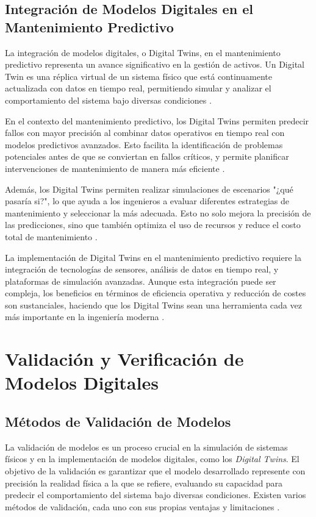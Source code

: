 \subsection{Integración de Modelos Digitales en el Mantenimiento Predictivo}

La integración de modelos digitales, o Digital Twins, en el mantenimiento predictivo representa un avance significativo en la gestión de activos. Un Digital Twin es una réplica virtual de un sistema físico que está continuamente actualizada con datos en tiempo real, permitiendo simular y analizar el comportamiento del sistema bajo diversas condiciones \cite{gabor2021digital}.

En el contexto del mantenimiento predictivo, los Digital Twins permiten predecir fallos con mayor precisión al combinar datos operativos en tiempo real con modelos predictivos avanzados. Esto facilita la identificación de problemas potenciales antes de que se conviertan en fallos críticos, y permite planificar intervenciones de mantenimiento de manera más eficiente \cite{tao2018digital}.

Además, los Digital Twins permiten realizar simulaciones de escenarios "¿qué pasaría si?", lo que ayuda a los ingenieros a evaluar diferentes estrategias de mantenimiento y seleccionar la más adecuada. Esto no solo mejora la precisión de las predicciones, sino que también optimiza el uso de recursos y reduce el costo total de mantenimiento \cite{fuller2020digital}.

La implementación de Digital Twins en el mantenimiento predictivo requiere la integración de tecnologías de sensores, análisis de datos en tiempo real, y plataformas de simulación avanzadas. Aunque esta integración puede ser compleja, los beneficios en términos de eficiencia operativa y reducción de costes son sustanciales, haciendo que los Digital Twins sean una herramienta cada vez más importante en la ingeniería moderna \cite{gabor2021digital}.

\section{Validación y Verificación de Modelos Digitales}

\subsection{Métodos de Validación de Modelos}

La validación de modelos es un proceso crucial en la simulación de sistemas físicos y en la implementación de modelos digitales, como los \textit{Digital Twins}. El objetivo de la validación es garantizar que el modelo desarrollado represente con precisión la realidad física a la que se refiere, evaluando su capacidad para predecir el comportamiento del sistema bajo diversas condiciones. Existen varios métodos de validación, cada uno con sus propias ventajas y limitaciones \cite{oberkampf2010verification}.


